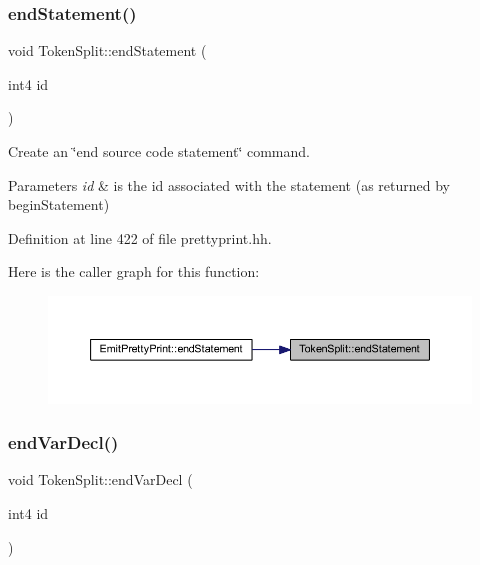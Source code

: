\subsubsection{\texorpdfstring{endStatement()}{endStatement()}}
{\footnotesize\ttfamily void Token\+Split\+::end\+Statement (\begin{DoxyParamCaption}\item[{int4}]{id }\end{DoxyParamCaption})\hspace{0.3cm}{\ttfamily [inline]}}



Create an \char`\"{}end source code statement\char`\"{} command. 


\begin{DoxyParams}{Parameters}
{\em id} & is the id associated with the statement (as returned by begin\+Statement) \\
\hline
\end{DoxyParams}


Definition at line 422 of file prettyprint.\+hh.

Here is the caller graph for this function\+:
\nopagebreak
\begin{figure}[H]
\begin{center}
\leavevmode
\includegraphics[width=350pt]{class_token_split_a33dd0d763dc8042bc3fca66fddff0b9b_icgraph}
\end{center}
\end{figure}
\mbox{\label{class_token_split_a6d5be5e7d3d58556488edb57a9ffb74e}} 
\subsubsection{\texorpdfstring{endVarDecl()}{endVarDecl()}}
{\footnotesize\ttfamily void Token\+Split\+::end\+Var\+Decl (\begin{DoxyParamCaption}\item[{int4}]{id }\end{DoxyParamCaption})\hspace{0.3cm}{\ttfamily [inline]}}



